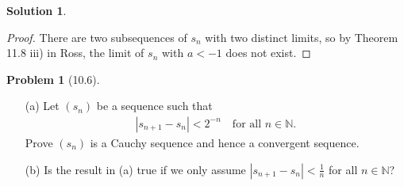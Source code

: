 \documentclass[12pt]{article}
\theoremstyle{definition} %
\newtheorem{solution}{Solution}
\newtheorem{problem}{Problem}
\theoremstyle{plain} %
\begin{document}
\begin{solution}
\begin{enumerate}
\begin{proof}
        There are two subsequences of $s_n$ with two distinct limits, so by Theorem 11.8 iii) in Ross, the limit of $s_n$ with $a < -1$ does not exist. 
    \end{proof}
\end{enumerate}
\end{solution}



\begin{problem}[10.6]
    \begin{enumerate}
        \item[(a)] Let $(s_n)$ be a sequence such that
        \begin{align}
        |s_{n+1} - s_n| < 2^{-n} \quad \text{for all } n \in \mathbb{N}.
        \end{align}
        Prove $(s_n)$ is a Cauchy sequence and hence a convergent sequence.
        \item[(b)] Is the result in (a) true if we only assume $|s_{n+1} - s_n| < \frac{1}{n}$ for all $n \in \mathbb{N}$?
    \end{enumerate}


\end{problem}
\end{document}
